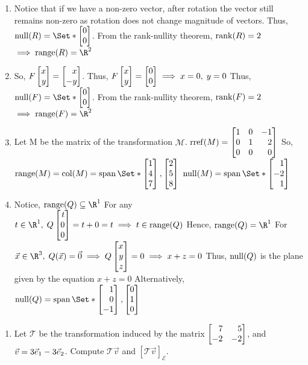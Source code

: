 \begin{exercises}
\begin{problist}
\begin{solution}
\begin{enumerate}
				\item Notice that if we have a non-zero vector, after rotation
					the vector still remains non-zero as rotation does
					not change magnitude of vectors. Thus, $\Null(R)=\Set*{\mat{0\\0}}$.
					From the rank-nullity theorem, $\operatorname{rank}(R) = 2$
					$\implies \Range(R) = \R^{2}$

				\item So, $F\mat{x\\y}= \mat{x\\-y}$. Thus,
					$F\mat{x\\y}= \mat{0\\0}\implies x=0, \; y=0$
					Thus, $\Null(F)=\Set*{\mat{0\\0}}$. From the rank-nullity
					theorem, $\operatorname{rank}(F) = 2$ $\implies \Range(F) = \R^{2}$

				\item Let M be the matrix of the transformation $\mathcal{M}$.
					$\Rref(M)= \mat{1&0&-1\\0&1&2\\0&0&0}$ So,
					$\Range(M)=\Col(M)=\Span\Set*{\mat{1\\4\\7},\mat{2\\5\\8}}$
					$\Null(M)=\Span\Set*{\mat{1\\-2\\1}}$

				\item Notice, $\Range(Q)\subseteq \R^{1}$ For any $t\in\R^{1},
					\; Q\mat{t\\0\\0}=t+0=t \implies t \in \Range(Q)$ Hence,
					$\Range(Q) = \R^{1}$ For $\vec x \in \R^{3}, \; Q(\vec
					x) = \vec 0 \implies Q\mat{x\\y\\z}=0 \implies x+z=0$
					Thus, $\operatorname{null}(Q)$ is the plane given by the equation
					$x+z=0$ Alternatively, $\Null(Q) = \Span\Set*{\mat{1\\0\\-1},\mat{0\\1\\0}}$
			\end{enumerate}
		\end{solution}

		\prob
		\begin{enumerate}
			\item Let $\mathcal T$ be the transformation induced by the matrix
				$\mat{7&5\\-2&-2}$, and $\vec v=3{\vec e_1}-3{\vec e_2}$. Compute $\mathcal
				T\vec v$ and $[\mathcal T\vec v]_{\mathcal E}$.


\end{enumerate}
\end{problist}
\end{exercises}
